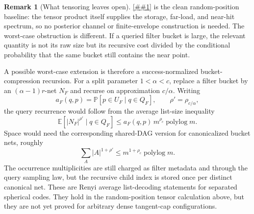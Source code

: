\documentclass[10pt]{article}
\newcommand{\Cref}[1]{\ref{##1}}
\theoremstyle{definition}
\newtheorem{remark}[theorem]{Remark}
\newcommand{\E}{\mathbb{E}}
\newcommand{\Prb}{\mathbb{P}}
\newcommand{\polylog}{\operatorname{polylog}}
\begin{document}
\begin{remark}[What tensoring leaves open]\label{rem:tensoring-random-open}
   \Cref{cor:random-position-tensoring} is the clean random-position baseline:
   the tensor product itself supplies the storage, far-load, and near-hit
   spectrum, so no posterior channel or finite-envelope construction is
   needed.  The worst-case obstruction is different.  If a queried filter
   bucket is large, the relevant quantity is not its raw size but its
   recursive cost divided by the conditional probability that the same bucket
   still contains the near point.

   A possible worst-case extension is therefore a success-normalized
   bucket-compression recursion.  For a split parameter \(1<\alpha<c\), replace
   a filter bucket by an \((\alpha-1)r\)-net \(N_F\) and recurse on
   approximation \(c/\alpha\).  Writing
   \[
      a_F(q,p)=\Prb[p\in U_F\mid q\in Q_F],
      \qquad
      \rho'=\rho_{c/\alpha},
   \]
   the query recurrence would follow from the average list-size inequality
   \[
      \E\!\left[
         |N_F|^{\rho'}\mid q\in Q_F
      \right]
      \le
      a_F(q,p)\,m^{\rho_c}\polylog m .
   \]
   Space would need the corresponding shared-DAG version for canonicalized
   bucket nets, roughly
   \[
      \sum_A |A|^{1+\rho'}
      \le
      m^{1+\rho_c}\polylog m .
   \]
   The occurrence multiplicities are still charged as filter metadata and
   through the query sampling law, but the recursive child index is stored once
   per distinct canonical net.
   These are Renyi average list-decoding statements for separated spherical
   codes.  They hold in the random-position tensor calculation above, but they
   are not yet proved for arbitrary dense tangent-cap configurations.
\end{remark}
\end{document}
